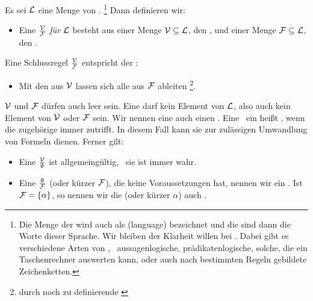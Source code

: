 Es sei $\mathcal{L}$ eine Menge von .%
	\footnote{%
	Die Menge der  wird auch als  (language) bezeichnet und die  sind dann die Worte dieser Sprache.
	Wir bleiben der Klarheit willen bei .
	Dabei gibt es verschiedene Arten von , \textzB\ aussagenlogische, prädikatenlogische, solche, die ein Taschenrechner auswerten kann, oder auch nach bestimmten Regeln gebildete Zeichenketten.
}
Dann definieren wir:
\begin{itemize}
	\item[] Eine  $\frac{\mathcal{V}}{\mathcal{F}}$ \emph{für} $\mathcal{L}$ besteht aus einer Menge $\mathcal{V}\subseteq\mathcal{L}$, den , und einer Menge $\mathcal{F}\subseteq\mathcal{L}$, den .
\end{itemize}
Eine Schlussregel $\frac{\mathcal{V}}{\mathcal{F}}$ entspricht der :
%
\begin{itemize}
	\item[] Mit den  aus $\mathcal{V}$ lassen sich alle  aus $\mathcal{F}$ ableiten%
	\footnote{durch noch zu definierende \emph{}}.
\end{itemize}
%
$\mathcal{V}$ und $\mathcal{F}$ dürfen auch leer sein.
Eine  darf kein Element von $\mathcal{L}$, also auch kein Element von $\mathcal{V}$ oder $\mathcal{F}$ sein.
Wir nennen eine  auch einen \emph{}.
Eine  \textbzw\ ein  heißt , wenn die zugehörige  immer zutrifft.
In diesem Fall kann sie zur zulässigen Umwandlung von Formeln dienen.
Ferner gilt:
%
\begin{itemize}
	\item Eine  $\frac{\mathcal{V}}{\emptyset}$ ist allgemeingültig, \textdh\ sie ist immer wahr.
	\item Eine  $\frac{\emptyset}{\mathcal{F}}$ (oder kürzer $\mathcal{F}$), die keine Voraussetzungen hat, nennen wir ein .
	Ist $\mathcal{F} = \{\alpha\}$, so nennen wir die  (oder kürzer $\alpha$) auch .
\end{itemize}

